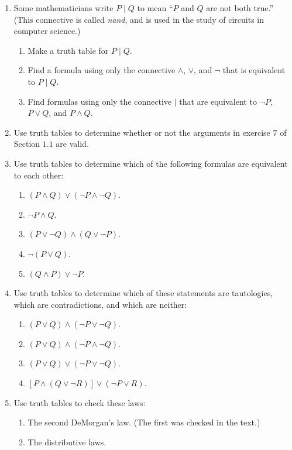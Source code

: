 \begin{enumerate}
\item Some mathematicians write $P \mid Q$ to mean ``$P$ and $Q$ are not both true.'' (This connective is called \emph{nand}, and is used in the study of circuits in computer science.)
  \begin{enumerate}
  \item Make a truth table for $P \mid Q$.
  \item Find a formula using only the connective $\land$, $\lor$, and $\neg$ that is equivalent to $P \mid Q$.
  \item Find formulas using only the connective $\mid$ that are equivalent to $\neg P$, $P \lor Q$, and $P \land Q$.
  \end{enumerate}

\item Use truth tables to determine whether or not the arguments in exercise $7$ of Section $1.1$ are valid.
  
\item Use truth tables to determine which of the following formulas are equivalent to each other:
  \begin{enumerate}
  \item $(P \land Q) \lor (\neg P \land \neg Q)$.
  \item $\neg P \land Q$.
  \item $(P \lor \neg Q) \land (Q \lor \neg P)$.
  \item $\neg (P \lor Q)$.
  \item $(Q \land P) \lor \neg P$.
  \end{enumerate}

\item Use truth tables to determine which of these statements are tautologies, which are contradictions, and which are neither:
  \begin{enumerate}
  \item $(P \lor Q) \land (\neg P \lor \neg Q)$.
  \item $(P \lor Q) \land (\neg P \land \neg Q)$.
  \item $(P \lor Q) \lor (\neg P \lor \neg Q)$.
  \item $[P \land (Q \lor \neg R)] \lor (\neg P \lor R)$.
  \end{enumerate}

\item Use truth tables to check these laws:
  \begin{enumerate}
  \item The second DeMorgan's law. (The first was checked in the text.)
  \item The distributive laws.
  \end{enumerate}


\end{enumerate}
